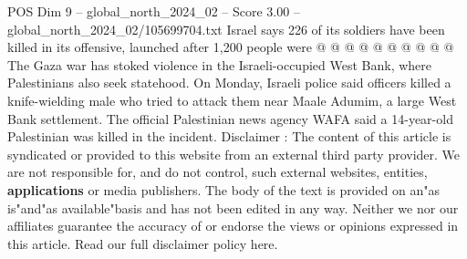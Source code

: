 \begin{textsample}{POS Dim 9 – global\_north\_2024\_02 – Score 3.00 – global\_north\_2024\_02/105699704.txt}
Israel says 226 of its soldiers have been killed in its offensive, launched after 1,200 people were @ @ @ @ @ @ @ @ @ @ The Gaza war has stoked violence in the Israeli-occupied West Bank, where Palestinians also seek statehood.
On Monday, Israeli police said officers killed a knife-wielding male who tried to attack them near Maale Adumim, a large West Bank settlement.
The official Palestinian news agency WAFA said a 14-year-old Palestinian was killed in the incident.
Disclaimer : The content of this article is syndicated or provided to this website from an external third party provider.
We are not responsible for, and do not control, such external websites, entities, \textbf{applications} or media publishers.
The body of the text is provided on an"as is"and"as available"basis and has not been edited in any way.
Neither we nor our affiliates guarantee the accuracy of or endorse the views or opinions expressed in this article.
Read our full disclaimer policy here.

\end{textsample}
